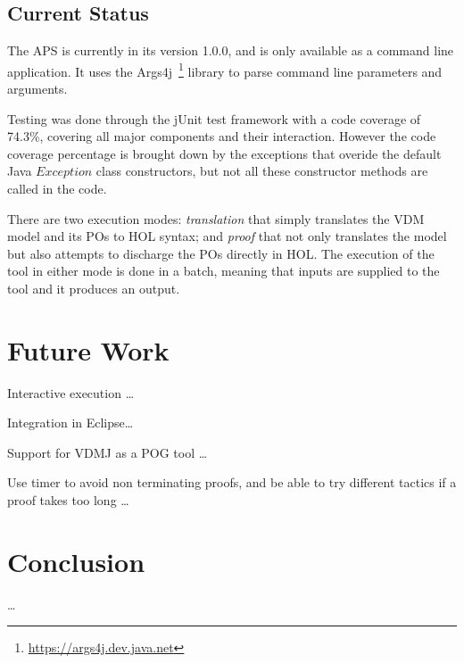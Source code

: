 \documentclass[]{article}
\begin{document}
\subsection{Current Status}

The APS is currently in its version 1.0.0, and is only available as a command line application.
It uses the Args4j~\footnote{\url{https://args4j.dev.java.net}} library to parse command line parameters and arguments.

Testing was done through the jUnit test framework with a code coverage of 74.3\%, covering all major components and their interaction.
However the code coverage percentage is brought down by the exceptions that overide the default Java $Exception$ class constructors, but not all these constructor methods are called in the code.

There are two execution modes: \emph{translation} that simply translates the VDM model and its POs to HOL syntax; and \emph{proof} that not only translates the model but also attempts to discharge the POs directly in HOL.
The execution of the tool in either mode is done in a batch, meaning that inputs are supplied to the tool and it produces an output.

\section{Future Work}
\label{sec:future_work}

Interactive execution \ldots

Integration in Eclipse\ldots

Support for VDMJ as a POG tool \ldots

Use timer to avoid non terminating proofs, and be able to try different tactics if a proof takes too long \ldots


\section{Conclusion}
\label{sec:conclusion}

\ldots
\end{document}
